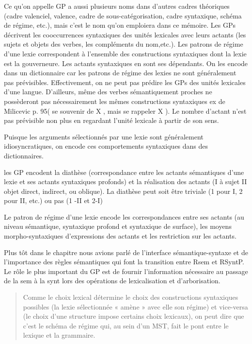 Ce qu'on appelle \ac{GP} a aussi plusieurs noms dans d'autres cadres théoriques (cadre valenciel, valence, cadre de sous-catégorisation, cadre syntaxique, schéma de régime, etc.), mais c'est le nom qu'on emploiera dans ce mémoire. Les \acp{GP} décrivent les cooccurrences syntaxiques des unités lexicales \citep{MilicevicSchemaregimepont2009} avec leurs actants (les sujets et objets des verbes, les compléments du nom,etc.). Les patrons de régime d'une lexie correspondent à l'ensemble des constructions syntaxiques dont la lexie est la gouverneure. Les actants syntaxiques en sont ses dépendants. On les encode dans un dictionnaire car les patrons de régime des lexies ne sont généralement pas prévisibles. Effectivement, on ne peut pas prédire les \acp{GP} des unités lexicales d'une langue. D'ailleurs, même des verbes sémantiquement proches ne possèderont pas nécessairement les mêmes constructions syntaxiques ex de Milicevic p. 95( se souvenir de X , mais se rappeler X ). Le nombre d'actant n'est pas prévisible non plus en regardant l'unité lexicale à partir de son sens. 

Puisque les arguments sélectionnés par une lexie sont généralement idiosyncratiques, on encode ces comportements syntaxiques dans des dictionnaires.

les GP encodent la diathèse (correspondance entre les actants sémantiques d'une lexie et ses actants syntaxiques profonds) et la réalisation des actants (I à sujet II objet direct, indirect, ou oblique). La diathèse peut soit être triviale (1 pour I, 2 pour II, etc.) ou pas (1 -II et 2-I)

Le patron de régime d'une lexie encode les correspondances entre ses actants (au niveau sémantique, syntaxique profond et syntaxique de surface), les moyens morpho-syntaxiques d'expressions des actants et les restriction sur les actants.

Plus tôt dans le chapitre nous avions parlé de l'interface sémantique-syntaxe et de l'importance des règles sémantiques qui font la transition entre Rsem et RSyntP. Le rôle le plus important du GP est de fournir l'information nécessaire au passage de la sem à la synt lors des opérations de lexicalisation et d’arborisation. 

\begin{quote}
Comme le choix lexical détermine le choix des constructions syntaxiques possibles (la lexie sélectionnée « amène » avec elle son régime) et vice-versa (le choix d’une structure impose certains choix lexicaux), on peut dire que c’est le schéma de régime qui, au sein d’un MST, fait le pont entre le lexique et la grammaire.
\end{quote}
\vspace{-\baselineskip}
\hfill
\cite[p.~105]{MilicevicSchemaregimepont2009}

